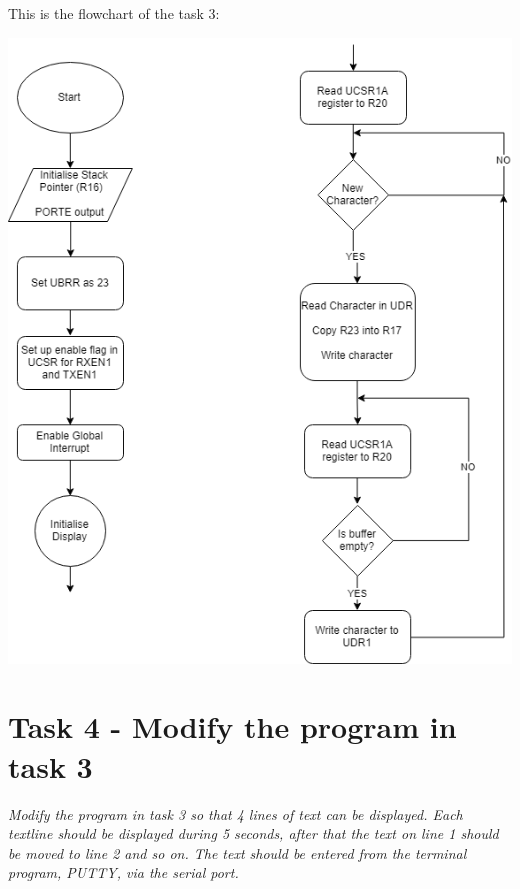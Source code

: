 \documentclass[a4paper,12pt]{article}
\begin{document}
This is the flowchart of the task 3:
\begin{center}
\includegraphics[scale=0.8]{img/TASK3.png}
\end{center}
\newpage
\section{Task 4 - Modify the program in task 3}
\textit{Modify the program in task 3 so that 4 lines of text can be displayed. Each textline should
be displayed during 5 seconds, after that the text on line 1 should be moved to line 2 and
so on. The text should be entered from the terminal program, PUTTY, via the serial port. }
\end{document}
